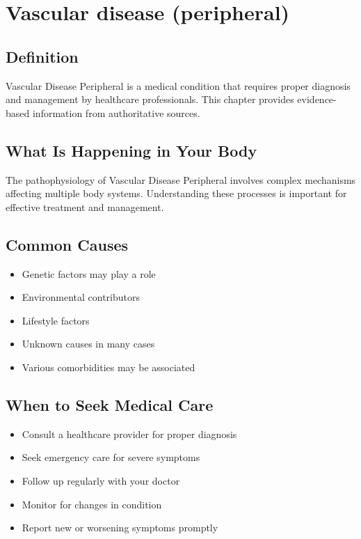 
\chapter{Vascular disease (peripheral)}

\section*{Definition}
Vascular Disease Peripheral is a medical condition that requires proper diagnosis and management by healthcare professionals. This chapter provides evidence-based information from authoritative sources.

\section*{What Is Happening in Your Body}
The pathophysiology of Vascular Disease Peripheral involves complex mechanisms affecting multiple body systems. Understanding these processes is important for effective treatment and management.

\section*{Common Causes}
\begin{itemize}
  \item Genetic factors may play a role
  \item Environmental contributors
  \item Lifestyle factors
  \item Unknown causes in many cases
  \item Various comorbidities may be associated
\end{itemize}

\section*{When to Seek Medical Care}
\begin{itemize}
  \item Consult a healthcare provider for proper diagnosis
  \item Seek emergency care for severe symptoms
  \item Follow up regularly with your doctor
  \item Monitor for changes in condition
  \item Report new or worsening symptoms promptly
\end{itemize}

